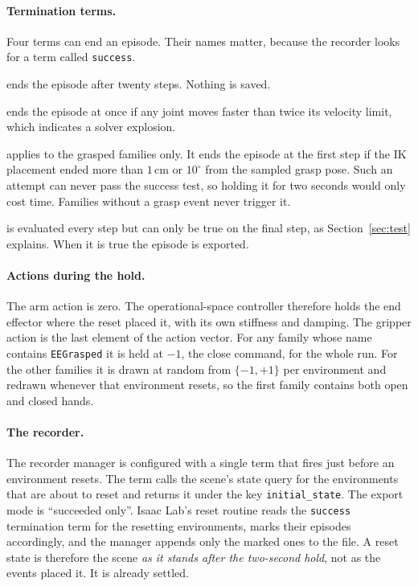 \documentclass{article}
\newcommand{\code}[1]{\texttt{#1}}
\begin{document}
\paragraph{Termination terms.}
Four terms can end an episode. Their names matter, because the recorder looks for a term called \code{success}.
\begin{description}[leftmargin=*, itemsep=2pt]
  \item[\code{time\_out}] ends the episode after twenty steps. Nothing is saved.
  \item[\code{abnormal\_robot}] ends the episode at once if any joint moves faster than twice its velocity limit, which indicates a solver explosion.
  \item[\code{grasp\_placement\_failed}] applies to the grasped families only. It ends the episode at the first step if the IK placement ended more than $1$\,cm or $10^\circ$ from the sampled grasp pose. Such an attempt can never pass the success test, so holding it for two seconds would only cost time. Families without a grasp event never trigger it.
  \item[\code{success}] is evaluated every step but can only be true on the final step, as Section~\ref{sec:test} explains. When it is true the episode is exported.
\end{description}

\paragraph{Actions during the hold.}
The arm action is zero. The operational-space controller therefore holds the end effector where the reset placed it, with its own stiffness and damping. The gripper action is the last element of the action vector. For any family whose name contains \code{EEGrasped} it is held at $-1$, the close command, for the whole run. For the other families it is drawn at random from $\{-1,+1\}$ per environment and redrawn whenever that environment resets, so the first family contains both open and closed hands.

\paragraph{The recorder.}
The recorder manager is configured with a single term that fires just before an environment resets. The term calls the scene's state query for the environments that are about to reset and returns it under the key \code{initial\_state}. The export mode is ``succeeded only''. Isaac Lab's reset routine reads the \code{success} termination term for the resetting environments, marks their episodes accordingly, and the manager appends only the marked ones to the file. A reset state is therefore the scene \emph{as it stands after the two-second hold}, not as the events placed it. It is already settled.
\end{document}

